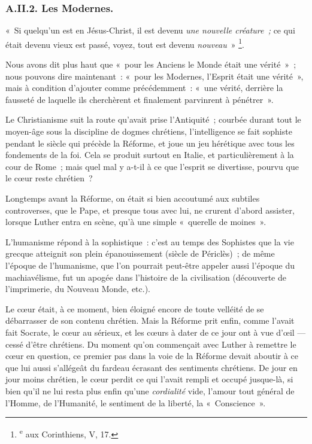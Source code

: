 \documentclass[french,twoside]{book} %
\begin{document}
\subsubsection[{A.II.2. Les Modernes.}]{A.II.2. Les Modernes.}
\noindent « Si quelqu’un est en Jésus-Christ, il est devenu \emph{une nouvelle créature ;} ce qui était devenu vieux est passé, voyez, tout est devenu \emph{nouveau} » \footnote{ \textsuperscript{e} aux Corinthiens, V, 17.
 }.\par
Nous avons dit plus haut que « pour les Anciens le Monde était une vérité » ; nous pouvons dire maintenant : « pour les Modernes, l’Esprit était une vérité », mais à condition d’ajouter comme précédemment : « une vérité, derrière la fausseté de laquelle ils cherchèrent et finalement parvinrent à pénétrer ».\par
Le Christianisme suit la route qu’avait prise l’Antiquité ; courbée durant tout le moyen-âge sous la discipline de dogmes chrétiens, l’intelligence se fait sophiste pendant le siècle qui précède la Réforme, et joue un jeu hérétique avec tous les fondements de la foi. Cela se produit surtout en Italie, et particulièrement à la cour de Rome ; mais quel mal y a-t-il à ce que l’esprit se divertisse, pourvu que le cœur reste chrétien ?\par
 Longtemps avant la Réforme, on était si bien accoutumé aux subtiles controverses, que le Pape, et presque tous avec lui, ne crurent d’abord assister, lorsque Luther entra en scène, qu’à une simple « querelle de moines ».\par
L’humanisme répond à la sophistique : c’est au temps des Sophistes que la vie grecque atteignit son plein épanouissement (siècle de Périclès) ; de même l’époque de l’humanisme, que l’on pourrait peut-être appeler aussi l’époque du machiavélisme, fut un apogée dans l’histoire de la civilisation (découverte de l’imprimerie, du Nouveau Monde, etc.).\par
Le cœur était, à ce moment, bien éloigné encore de toute velléité de se débarrasser de son contenu chrétien. Mais la Réforme prit enfin, comme l’avait fait Socrate, le cœur au sérieux, et les cœurs à dater de ce jour ont à vue d’œil — cessé d’être chrétiens. Du moment qu’on commençait avec Luther à remettre le cœur en question, ce premier pas dans la voie de la Réforme devait aboutir à ce que lui aussi s’allégeât du fardeau écrasant des sentiments chrétiens. De jour en jour moins chrétien, le cœur perdit ce qui l’avait rempli et occupé jusque-là, si bien qu’il ne lui resta plus enfin qu’une \emph{cordialité} vide, l’amour tout général de l’Homme, de l’Humanité, le sentiment de la liberté, la « Conscience ».\par
\end{document}
